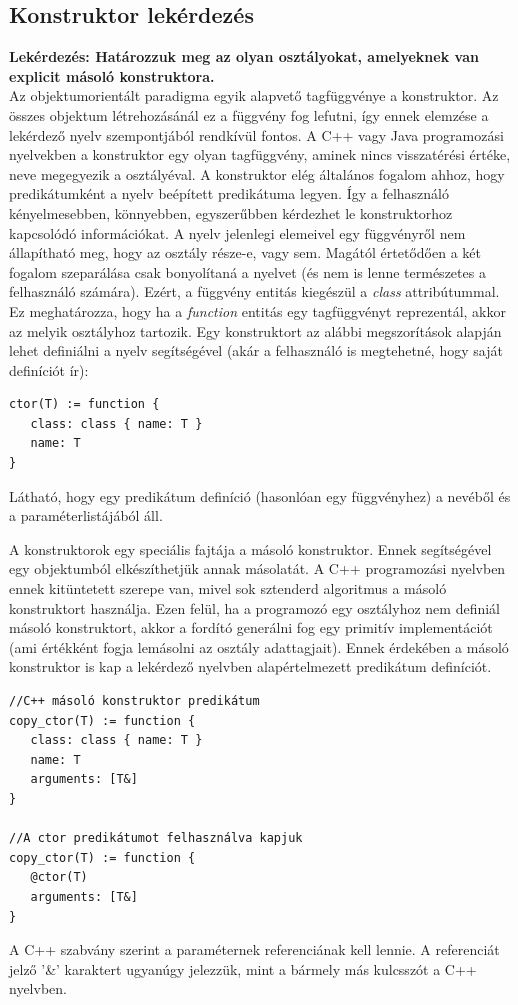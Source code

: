 \documentclass[a4paper,12pt]{report}
\begin{document}
\subsection{Konstruktor lekérdezés}
\textbf{Lekérdezés: Határozzuk meg az olyan osztályokat, amelyeknek van explicit másoló konstruktora.}
\\
Az objektumorientált paradigma egyik alapvető tagfüggvénye a konstruktor. Az összes objektum létrehozásánál ez a függvény fog lefutni, így ennek elemzése a lekérdező nyelv szempontjából rendkívül fontos. A C++ vagy Java programozási nyelvekben a konstruktor egy olyan tagfüggvény, aminek nincs visszatérési értéke, neve megegyezik a osztályéval. A konstruktor elég általános fogalom ahhoz, hogy predikátumként a nyelv beépített predikátuma legyen. Így a felhasználó kényelmesebben, könnyebben, egyszerűbben kérdezhet le konstruktorhoz kapcsolódó információkat. A nyelv jelenlegi elemeivel egy függvényről nem állapítható meg, hogy az osztály része-e, vagy sem. Magától értetődően a két fogalom szeparálása csak bonyolítaná a nyelvet (és nem is lenne természetes a felhasználó számára). Ezért, a függvény entitás kiegészül a \textit{class} attribútummal. Ez meghatározza, hogy ha a \textit{function} entitás egy tagfüggvényt reprezentál, akkor az melyik osztályhoz tartozik. Egy konstruktort az alábbi megszorítások alapján lehet definiálni a nyelv segítségével (akár a felhasználó is megtehetné, hogy saját definíciót ír):
\begin{verbatim}
ctor(T) := function {
   class: class { name: T }
   name: T
}
\end{verbatim}
\par Látható, hogy egy predikátum definíció (hasonlóan egy függvényhez) a nevéből és a paraméterlistájából áll.
\par A konstruktorok egy speciális fajtája a másoló konstruktor. Ennek segítségével egy objektumból elkészíthetjük annak másolatát. A C++ programozási nyelvben ennek kitüntetett szerepe van, mivel sok sztenderd algoritmus a másoló konstruktort használja. Ezen felül, ha a programozó egy osztályhoz nem definiál másoló konstruktort, akkor a fordító generálni fog egy primitív implementációt (ami értékként fogja lemásolni az osztály adattagjait). Ennek érdekében a másoló konstruktor is kap a lekérdező nyelvben alapértelmezett predikátum definíciót.
\begin{verbatim}
//C++ másoló konstruktor predikátum
copy_ctor(T) := function {
   class: class { name: T }
   name: T
   arguments: [T&]
}

//A ctor predikátumot felhasználva kapjuk
copy_ctor(T) := function {
   @ctor(T)
   arguments: [T&]
}
\end{verbatim}
\par A C++ szabvány szerint a paraméternek referenciának kell lennie. A referenciát jelző '\&' karaktert ugyanúgy jelezzük, mint a bármely más kulcsszót a C++ nyelvben. 
\end{document}

